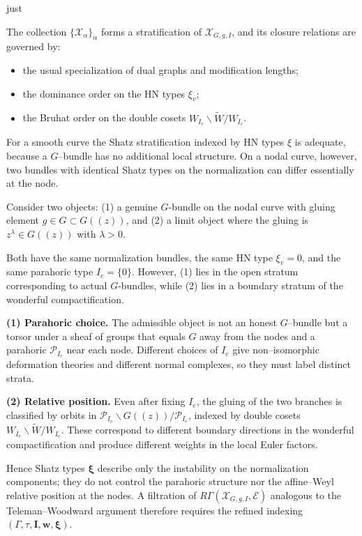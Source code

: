 just \documentclass[12pt]{article}
\begin{document}
The collection $\{\mathcal X_\alpha\}_\alpha$ forms a stratification of
$\mathcal X_{G,g,I}$, and its closure relations are governed by:
\begin{itemize}
\item the usual specialization of dual graphs and modification lengths;
\item the dominance order on the HN types $\xi_v$;
\item the Bruhat order on the double cosets
      $W_{I_e}\backslash \widetilde W / W_{I_e}$.
\end{itemize}

\begin{remark}
For a smooth curve the Shatz stratification indexed by HN types $\xi$
is adequate, because a $G$--bundle has no additional local structure.
On a nodal curve, however, two bundles with identical Shatz types on the
normalization can differ essentially at the node.


Consider two objects: (1) a genuine $G$-bundle on the nodal curve with gluing element $g\in G \subset G((z))$, and (2) a limit object where the gluing is $z^\lambda \in G((z))$ with $\lambda>0$.

Both have the same normalization bundles, the same HN type $\xi_v=0$, and the same parahoric type $I_e=\{0\}$. However, (1) lies in the open stratum corresponding to actual $G$-bundles, while (2) lies in a boundary stratum of the wonderful compactification.


\smallskip
\noindent\textbf{(1) Parahoric choice.}
The admissible object is not an honest $G$--bundle but a torsor under a
sheaf of groups that equals $G$ away from the nodes and a parahoric
$\mathcal P_{I_e}$ near each node.  
Different choices of $I_e$ give non--isomorphic deformation theories and
different normal complexes, so they must label distinct strata.

\smallskip
\noindent\textbf{(2) Relative position.}
Even after fixing $I_e$, the gluing of the two branches is classified by
orbits in
$\mathcal P_{I_e}\backslash G((z))/\mathcal P_{I_e}$,
indexed by double cosets
$W_{I_e}\backslash\widetilde W/W_{I_e}$.
These correspond to different boundary directions in the wonderful
compactification and produce different weights in the local Euler factors.

\smallskip
Hence Shatz types $\boldsymbol{\xi}$ describe only the instability on the
normalization components; they do not control the parahoric structure nor
the affine--Weyl relative position at the nodes.
A filtration of $R\Gamma(\mathcal X_{G,g,I},\mathcal E)$ analogous to the
Teleman--Woodward argument therefore requires the refined indexing
$(\Gamma,\tau,\mathbf I,\mathbf w,\boldsymbol{\xi})$.
\end{remark}
\end{document}
